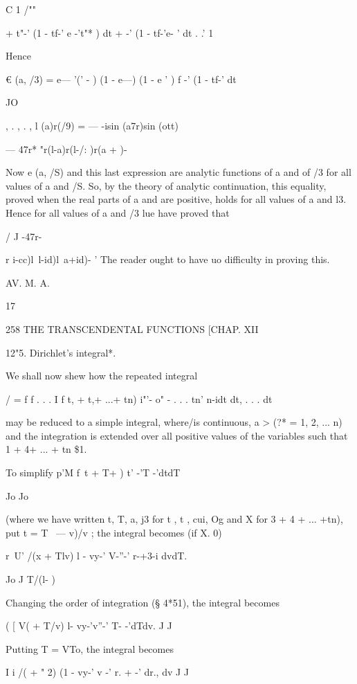 C 1 /""

+ t"-' (1 - tf-' e -'t"* ) dt + -' (1 - tf-'e- ' dt . .' 1

Hence

€ (a, /3) = e— '(' - ) (1 - e---) (1 - e ' ) f -' (1 - tf-' dt

JO

, . , . , l (a)r(/9) = — -isin (a7r)sin (ott) ~

— 47r* "r(l-a)r(l-/: )r(a + )-

Now e (a, /S) and this last expression are analytic functions of a and
of /3 for all values of a and /S. So, by the theory of analytic
continuation, this equality, proved when the real parts of a and are
positive, holds for all values of a and l3. Hence for all values of a
and /3 lue have proved that

/ J -47r-



r i-cc)l\ l-id)l\ a+id)- ' The reader ought to have uo difficulty in
proving this.



AV. M. A.



17



258 THE TRANSCENDENTAL FUNCTIONS [CHAP. XII

12"5. Dirichlet's integral*.

We shall now shew how the repeated integral

/ = f f . . . I f t, + t,+ ...+ tn) i"'- o" - . . . tn' n-idt dt, . .
. dt

may be reduced to a simple integral, where/is continuous, a > (?* = 1,
2, ... n) and the integration is extended over all positive values of
the variables such that 1 + 4+ ... + tn \$1.

To simplify p'M f\ t + T+ ) t' -'T -'dtdT

Jo Jo

(where we have written t, T, a, j3 for t , t , cui, Og and X for 3 + 4
+ ... +tn), put t = T \ — v)/v ; the integral becomes (if X. 0)

r~U' /(x + Tlv) l - vy-' V-''-' r-+3-i dvdT.

Jo J T/(l- )

Changing the order of integration (§ 4*51), the integral becomes

( [ V( + T/v) l- vy-'v''-' T- -'dTdv. J J

Putting T = VTo, the integral becomes

I i /( + " 2) (1 - vy-' v -' r. + -' dr., dv J J

